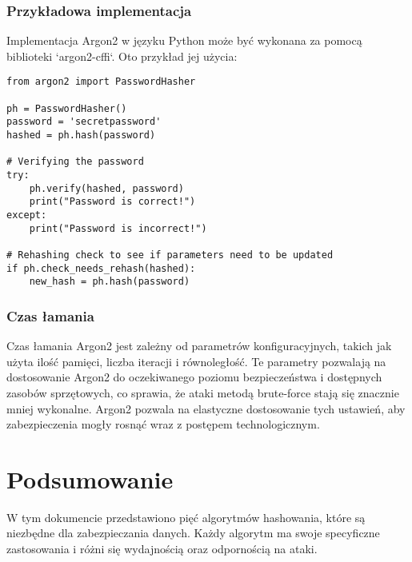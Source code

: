 \documentclass[12pt,a4paper]{article}
\begin{document}
\subsubsection{Przykładowa implementacja}
Implementacja Argon2 w języku Python może być wykonana za pomocą biblioteki `argon2-cffi`. Oto przykład jej użycia:

\begin{verbatim}
from argon2 import PasswordHasher

ph = PasswordHasher()
password = 'secretpassword'
hashed = ph.hash(password)

# Verifying the password
try:
    ph.verify(hashed, password)
    print("Password is correct!")
except:
    print("Password is incorrect!")

# Rehashing check to see if parameters need to be updated
if ph.check_needs_rehash(hashed):
    new_hash = ph.hash(password)
\end{verbatim}

\subsubsection{Czas łamania}
Czas łamania Argon2 jest zależny od parametrów konfiguracyjnych, takich jak użyta ilość pamięci, liczba iteracji i równoległość. Te parametry pozwalają na dostosowanie Argon2 do oczekiwanego poziomu bezpieczeństwa i dostępnych zasobów sprzętowych, co sprawia, że ataki metodą brute-force stają się znacznie mniej wykonalne. Argon2 pozwala na elastyczne dostosowanie tych ustawień, aby zabezpieczenia mogły rosnąć wraz z postępem technologicznym.


\section{Podsumowanie}
W tym dokumencie przedstawiono pięć algorytmów hashowania, które są niezbędne dla zabezpieczania danych. Każdy algorytm ma swoje specyficzne zastosowania i różni się wydajnością oraz odpornością na ataki.
\end{document}
